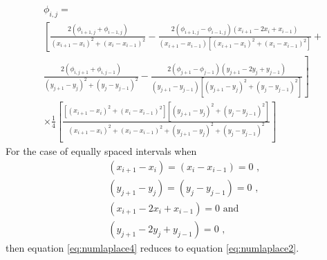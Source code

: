 \documentclass[12pt,a4paper,fleqn]{article}
\begin{document}
    \begin{align} \label{eq:numlaplace4}
    &\phi_{i,j} = \nonumber\\
    &\left[\frac{2(\phi_{i+1,j} + \phi_{i-1,j})}{(x_{i+1} - x_i)^2 + (x_i - x_{i-1})^2} - \frac{2(\phi_{i+1,j} - \phi_{i-1,j})(x_{i+1} - 2x_i + x_{i-1})}{(x_{i+1} - x_{i-1})[(x_{i+1} - x_i)^2 + (x_i - x_{i-1})^2]} + {} \right.\nonumber\\
    &\left.\frac{2(\phi_{i,j+1} + \phi_{i,j-1})}{(y_{j+1} - y_j)^2 + (y_j - y_{j-1})^2} - \frac{2(\phi_{j+1} - \phi_{j-1})(y_{j+1} - 2y_j + y_{j-1})}{(y_{j+1} - y_{j-1})[(y_{j+1} - y_j)^2 + (y_j - y_{j-1})^2]}\right] \nonumber\\
    &\times\frac{1}{4}\left[\frac{[(x_{i+1} - x_i)^2 + (x_i - x_{i-1})^2][(y_{j+1} - y_j)^2 + (y_j - y_{j-1})^2]}{(x_{i+1} - x_i)^2 + (x_i - x_{i-1})^2 + (y_{j+1} - y_j)^2 + (y_j - y_{j-1})^2}\right]
    \end{align}
    For the case of equally spaced intervals when
    \begin{align*}
    &(x_{i+1} - x_i) = (x_i - x_{i-1}) = 0\text{ ,}\\
    &(y_{j+1} - y_j) = (y_j - y_{j-1}) = 0\text{ ,}\\
    &(x_{i+1} - 2x_i + x_{i-1}) = 0\text{ and}\\
    &(y_{j+1} - 2y_j + y_{j-1}) = 0\text{ ,}
    \end{align*}
    then equation \eqref{eq:numlaplace4} reduces to equation \eqref{eq:numlaplace2}.
\end{document}
